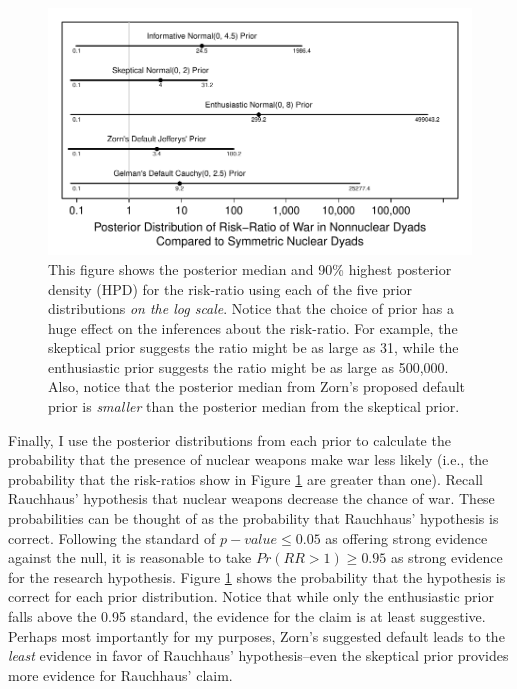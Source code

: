 \documentclass[12pt]{article}
\begin{document}
\begin{figure}[H]
\begin{center}
\includegraphics[scale = .8]{figs/bm-rr.pdf}
\caption{This figure shows the posterior median and 90\% highest posterior density (HPD) for the risk-ratio using each of the five prior distributions \emph{on the log scale}. Notice that the choice of prior has a huge effect on the inferences about the risk-ratio. For example, the skeptical prior suggests the ratio might be as large as 31, while the enthusiastic prior suggests the ratio might be as large as 500,000. Also, notice that the posterior median from Zorn's proposed default prior is \emph{smaller} than the posterior median from the skeptical prior.}\label{fig:bm-rr}
\end{center}
\end{figure}

%

Finally, I use the posterior distributions from each prior to calculate the probability that the presence of nuclear weapons make war less likely (i.e., the probability that the risk-ratios show in Figure \ref{fig:bm-rr} are greater than one). Recall Rauchhaus' hypothesis that nuclear weapons decrease the chance of war. These probabilities can be thought of as the probability that Rauchhaus' hypothesis is correct. Following the standard of $p-value \leq 0.05$ as offering strong evidence against the null, it is reasonable to take $Pr(RR > 1) \geq 0.95$ as strong evidence for the research hypothesis. Figure \ref{fig:bm-rr} shows the probability that the hypothesis is correct for each prior distribution. Notice that while only the enthusiastic prior falls above the 0.95 standard, the evidence for the claim is at least suggestive. Perhaps most importantly for my purposes, Zorn's suggested default leads to the \emph{least} evidence in favor of Rauchhaus' hypothesis--even the skeptical prior provides more evidence for Rauchhaus' claim.
\end{document}
